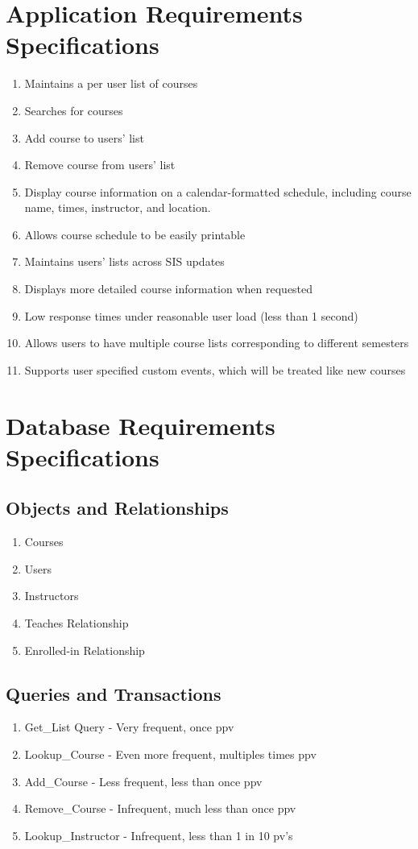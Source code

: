 \documentclass[pdftex,12pt,letter]{article}
\begin{document}
\section*{Application Requirements Specifications}
\begin{enumerate}[1.]
\item Maintains a per user list of courses
\item Searches for courses
\item Add course to users' list
\item Remove course from users' list
\item Display course information on a calendar-formatted schedule, including course name, times, instructor, and location.
\item Allows course schedule to be easily printable
\item Maintains users' lists across SIS updates
\item Displays more detailed course information when requested
\item Low response times under reasonable user load (less than 1 second)
\item Allows users to have multiple course lists corresponding to different semesters
\item Supports user specified custom events, which will be treated like new courses
\end{enumerate}
\section*{Database Requirements Specifications}
\subsection*{Objects and Relationships}
\begin{enumerate}[1.]
\item Courses
\item Users
\item Instructors
\item Teaches Relationship
\item Enrolled-in Relationship
\end{enumerate}
\subsection*{Queries and Transactions}
\begin{enumerate}[1.]
\item Get\_List Query - Very frequent, once ppv
\item Lookup\_Course - Even more frequent, multiples times ppv
\item Add\_Course - Less frequent, less than once ppv
\item Remove\_Course - Infrequent, much less than once ppv
\item Lookup\_Instructor - Infrequent, less than 1 in 10 pv's
\end{enumerate}
\end{document}
